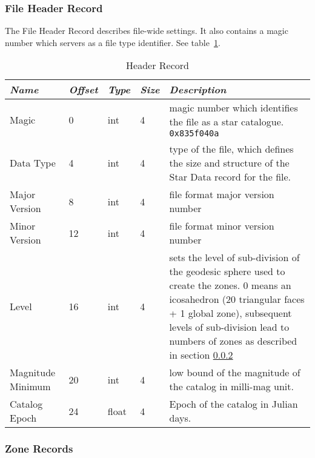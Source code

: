 \subsubsection{File Header Record}%
\label{sec:Catalogues:stars:record:header}

The File Header Record describes file-wide settings. It also contains a
magic number which servers as a file type identifier. See table~\ref{tab:Catalogues:stars:record:header}.

\begin{table}[htbp]
\begin{tabularx}{\textwidth}{llllX}\toprule
\emph{Name} & \emph{Offset} & \emph{Type} & \emph{Size} & \emph{Description}\\\midrule
Magic             &  0 & int   & 4 & magic number which identifies the file as a star catalogue. \texttt{0x835f040a}\\%
Data Type         &  4 & int   & 4 & type of the file, which defines the size and structure 
                                   of the Star Data record for the file.\\%
Major Version     &  8 & int   & 4 & file format major version number\\%
Minor Version     & 12 & int   & 4 & file format minor version number\\%
Level             & 16 & int   & 4 & sets the level of sub-division of the geodesic sphere used to create the zones. 
                                   0 means an icosahedron (20 triangular faces + 1 global zone), 
                                   subsequent levels of sub-division lead to numbers of zones 
                                   as described in section \ref{sec:Catalogues:stars:record:zone}\\%
Magnitude Minimum & 20 & int   & 4 &  low bound of the magnitude of the catalog in milli-mag unit.  \\%
Catalog Epoch     & 24 & float & 4 &  Epoch of the catalog in Julian days.\\%
\end{tabularx}
\caption{Header Record}
\label{tab:Catalogues:stars:record:header}
\end{table}

\subsubsection{Zone Records}%
\label{sec:Catalogues:stars:record:zone}

